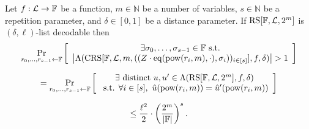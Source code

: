 \begin{lemma}\label{lemma:out_of_domain_sampling_crs_eq_rs}
    Let $f : \mathcal{L} \rightarrow \mathbb{F}$ be a function, $m \in \mathbb{N}$ be a number of variables, $s \in \mathbb{N}$ be a repetition parameter, and $\delta \in [0,1]$ be a distance parameter. If $\mathrm{RS}[\mathbb{F}, \mathcal{L}, 2^m]$ is $(\delta, \ell)$-list decodable then
    \[
    \Pr_{r_0, \dots, r_{s-1} \leftarrow \mathbb{F}} \left[
    \begin{array}{c}
    \exists \sigma_0, \dots, \sigma_{s-1} \in \mathbb{F} \text{ s.t.} \\
    \left| \Lambda(\mathrm{CRS}[\mathbb{F}, \mathcal{L}, m, ((Z \cdot \mathrm{eq}(\mathrm{pow}(r_{i}, m), \cdot), \sigma_{i}))_{i \in [s]}], f, \delta) \right| > 1
    \end{array}
    \right]
    \]

    \[
    = \Pr_{r_0, \dots, r_{s-1} \leftarrow \mathbb{F}} \left[
    \begin{array}{c}
    \exists \text{ distinct } u, u' \in \Lambda(\mathrm{RS}[\mathbb{F}, \mathcal{L}, 2^m], f, \delta) \\
    \text{ s.t. } \forall i \in [s],\ \hat{u}(\mathrm{pow}(r_i, m)) = \hat{u}'(\mathrm{pow}(r_i, m))
    \end{array}
    \right]
    \]

    \[
    \leq \frac{\ell^2}{2} \cdot \left( \frac{2^m}{|\mathbb{F}|} \right)^s.
    \]
\end{lemma}

